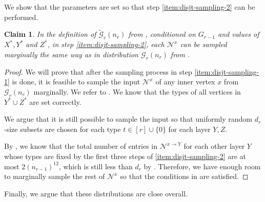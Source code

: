 \documentclass[11pt]{article}
\newtheorem{claim}[lemma]{Claim}
\theoremstyle{definition}
\newcommand{\Xstar}{\ensuremath{X^{*}}}
\newcommand{\Ystar}{\ensuremath{Y^{*}}}
\newcommand{\Zstar}{\ensuremath{Z^{*}}}
\newcommand{\Nbtogether}[2]{\ensuremath{\mathcal{N}^{#1_{#2}}}}
\newcommand{\Nbhood}[3]{\ensuremath{\mathcal{N}^{#1_{#3} \to #2}}}
\newcommand{\cG}{\ensuremath{\mathcal{G}}}
\newcommand{\cGtil}{\ensuremath{\widetilde{\cG}}}
\begin{document}
We show that the parameters are set so that step \ref{item:disjt-sampling-2} can be performed. 
\begin{claim}\label{clm:sample-input-separate}
	In the definition of $\cGtil_r(n_r)$ from , conditioned on $G_{r-1}$ and values of $\Xstar, \Ystar$ and $\Zstar$, in step \ref{item:disjt-sampling-2}, each $\Nbtogether{x}{}$  can be sampled marginally the same way as in distribution $\cG_r(n_r)$ from .
\end{claim}
\begin{proof}
We will prove that after the sampling process in step \ref{item:disjt-sampling-1} is done, it is feasible to sample the input $\Nbtogether{x}{}$ of any inner vertex $x$ from $\cG_r(n_r)$ marginally. 
	We refer to . We know that the types of all vertices in $\Ystar \cup \Zstar$ are set correctly. 
	
We argue that it is still possible to sample the input so that uniformly random $d_r$-size subsets are chosen for each type $t \in [r] \cup \{0\}$ for each layer $Y, Z$. 
	
	By , we know that the total number of entries in $\Nbhood{x}{Y}{}$ for each other layer $Y$ whose types are fixed by the first three steps of \ref{item:disjt-sampling-2} are at most $2(n_{r-1})^{12}$,
	which is still less than $d_r$ by . Therefore, we have enough room to marginally sample the rest of $\Nbtogether{x}{}$ so that the conditions in  are satisfied. 
\end{proof}

Finally, we argue that these distributions are close overall. %
\end{document}

